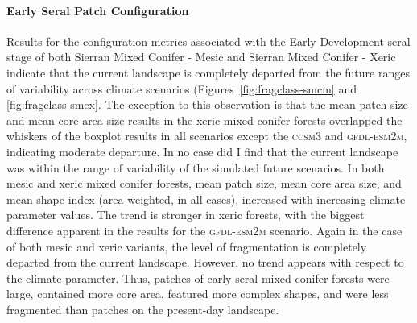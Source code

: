 \paragraph*{Early Seral Patch Configuration}
Results for the configuration metrics associated with the Early Development seral stage of both Sierran Mixed Conifer - Mesic and Sierran Mixed Conifer - Xeric indicate that the current landscape is completely departed from the future ranges of variability across climate scenarios (Figures~\ref{fig:fragclass-smcm} and \ref{fig:fragclass-smcx}. The exception to this observation is that the mean patch size and mean core area size results in the xeric mixed conifer forests overlapped the whiskers of the boxplot results in all scenarios except the \textsc{ccsm3} and \textsc{gfdl-esm2m}, indicating moderate departure. In no case did I find that the current landscape was within the range of variability of the simulated future scenarios. In both mesic and xeric mixed conifer forests, mean patch size, mean core area size, and mean shape index (area-weighted, in all cases), increased with increasing climate parameter values. The trend is stronger in xeric forests, with the biggest difference apparent in the results for the \textsc{gfdl-esm2m} scenario. Again in the case of both mesic and xeric variants, the level of fragmentation is completely departed from the current landscape. However, no trend appears with respect to the climate parameter. Thus, patches of early seral mixed conifer forests were large, contained more core area, featured more complex shapes, and were less fragmented than patches on the present-day landscape.


